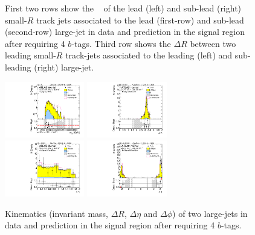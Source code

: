 \begin{figure}[htbp!]
\begin{center}
  \caption{First two rows show the \pt~ of the lead (left) and sub-lead (right) small-$R$ track jets associated to the lead (first-row) and sub-lead (second-row) large-\R jet in data and prediction in the signal region after requiring 4 $b$-tags. Third row shows the $\Delta R$ between two leading small-$R$ track-jets associated to the leading (left) and sub-leading (right) large-\R jet.  }
  \label{fig:boosted-4b-signal-ak2}
\end{center}
\end{figure}


\begin{figure}[htbp!]
\begin{center}
\includegraphics[width=0.31\textwidth,angle=-90]{figures/boosted/Signal/b77_FourTag_Signal_mHH_l_1.pdf}
\includegraphics[width=0.31\textwidth,angle=-90]{figures/boosted/Signal/b77_FourTag_Signal_hCandDr.pdf}\\
\includegraphics[width=0.31\textwidth,angle=-90]{figures/boosted/Signal/b77_FourTag_Signal_hCandDeta.pdf}
\includegraphics[width=0.31\textwidth,angle=-90]{figures/boosted/Signal/b77_FourTag_Signal_hCandDphi.pdf}
  \caption{Kinematics (invariant mass, $\Delta R$, $\Delta \eta$ and $\Delta \phi$) of two large-\R jets in data and prediction in the signal region after requiring 4 $b$-tags.  }
  \label{fig:boosted-4b-signal-ak10-system}
\end{center}
\end{figure}

